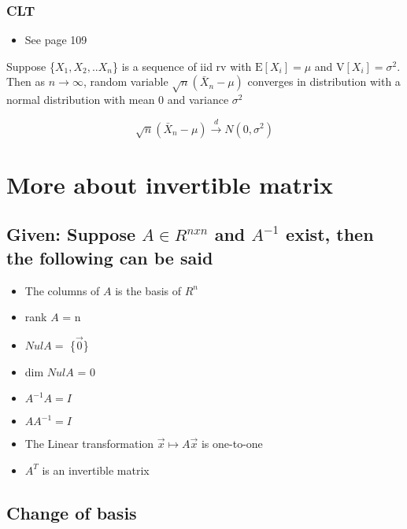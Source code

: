 \documentclass[
]{article}
\providecommand{\tightlist}{%
  \setlength{\itemsep}{0pt}\setlength{\parskip}{0pt}}
\begin{document}
\hypertarget{clt-1}{%
\subsubsection{CLT}\label{clt-1}}

\begin{itemize}
\tightlist
\item
  See page 109
\end{itemize}

Suppose \{\(X_1, X_2,..X_n\)\} is a sequence of iid rv with
\(\text{E}[X_i]=\mu\) and \(\text{V}[X_i] = \sigma^2\). Then as
\(n \rightarrow \infty\), random variable \(\sqrt{n}(\bar{X}_n - \mu)\)
converges in distribution with a normal distribution with mean \(0\) and
variance \(\sigma^2\)

\[\sqrt{n}(\bar{X}_n - \mu) \xrightarrow d N(0,\sigma^2)\]

\hypertarget{more-about-invertible-matrix}{%
\section{More about invertible
matrix}\label{more-about-invertible-matrix}}

\hypertarget{given-suppose-ain-rnxn-and-a-1-exist-then-the-following-can-be-said}{%
\subsection{\texorpdfstring{Given: Suppose \(A\in R^{nxn}\) and
\(A^{-1}\) exist, then the following can be
said}{Given: Suppose A\textbackslash in R\^{}\{nxn\} and A\^{}\{-1\} exist, then the following can be said}}\label{given-suppose-ain-rnxn-and-a-1-exist-then-the-following-can-be-said}}

\begin{itemize}
\tightlist
\item
  The columns of \(A\) is the basis of \(R^{n}\)
\item
  rank \(A\) = n
\item
  \(Nul A=\) \{\(\vec{0}\)\}
\item
  dim \(Nul A\) = 0
\item
  \(A^{-1}A=I\)
\item
  \(AA^{-1}=I\)
\item
  The Linear transformation \(\vec{x} \mapsto A\vec{x}\) is one-to-one
\item
  \(A^T\) is an invertible matrix
\end{itemize}

\hypertarget{change-of-basis}{%
\subsection{Change of basis}\label{change-of-basis}}
\end{document}
